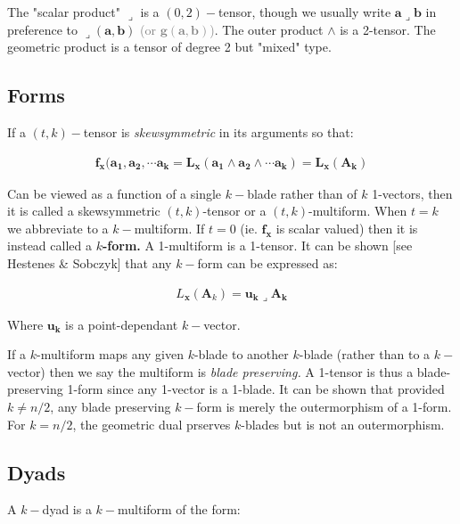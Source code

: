 \documentclass[a4paper]{book}
\numberwithin{equation}{chapter}
\begin{document}
\vspace{\baselineskip}

The "scalar product" $\lrcorner$ is a $(0,2)-$tensor, though we usually write 
$\mathbf{a\lrcorner b}$ in preference to $\lrcorner(\mathbf{a,b})$ \textcolor{gray}{(or $\mathbf{g(a,b)}$)}. 
The outer product $\wedge$ is a 2-tensor. 
The geometric product is a tensor of degree 2 but "mixed" type. 


\subsection{Forms}

If a $(t,k)-$tensor is \emph{skewsymmetric} in its arguments so that:

\begin{align*}
    \mathbf{f_x(a_1,a_2,\cdots a_k} = \mathbf{L_x(a_1 \wedge a_2 \wedge \cdots a_k)} = \mathbf{L_x(A_k)}
\end{align*}

Can be viewed as a function of a single $k-$blade rather than of $k$ 1-vectors,
then it is called a skewsymmetric $(t,k)$-tensor or a $(t,k)$-multiform. 
When $t=k$ we abbreviate to a $k-$multiform. If $t=0$ 
(ie. $\mathbf{f_x}$  is scalar valued) then it is instead called a \textbf{$k$-form.} 
A 1-multiform is a 1-tensor. It can be shown [see Hestenes & Sobczyk] that any $k-$form
can be expressed as:

\begin{align*}
    L_{\mathbf{x}}(\mathbf{A}_k) = \mathbf{u_k \lrcorner A_k}
\end{align*}

Where  $\mathbf{u_k}$ is a point-dependant $k-$vector.

\vspace{\baselineskip}

If a $k$-multiform maps any given $k$-blade to another $k$-blade 
(rather than to a $k-$vector) then we say the multiform is \emph{blade preserving.}
A 1-tensor is thus a blade-preserving 1-form since any 1-vector is a 1-blade. 
It can be shown that provided $k \ne n/2$, any blade preserving $k-$form
is merely the outermorphism of a 1-form. For $k=n/2$, the geometric 
dual prserves $k$-blades but is not an outermorphism.


\subsection{Dyads}

A $k-$dyad is a $k-$multiform of the form:
\end{document}
